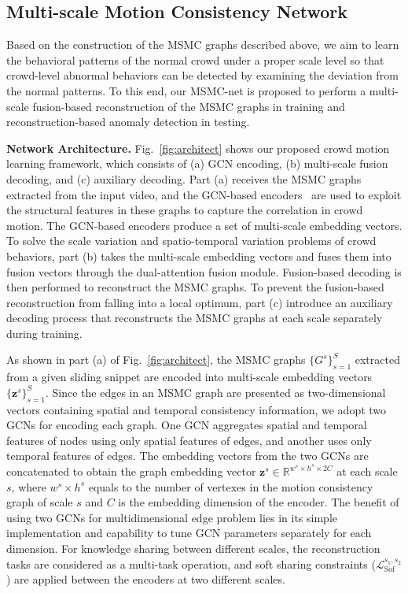\documentclass[journal]{IEEEtran}
\begin{document}
\subsection{Multi-scale Motion Consistency Network}
Based on the construction of the MSMC graphs described above, we aim to learn the behavioral patterns of the normal crowd under a proper scale level so that crowd-level abnormal behaviors can be detected by examining the deviation from the normal patterns. To this end, our MSMC-net is proposed to perform a multi-scale fusion-based reconstruction of the MSMC graphs in training and reconstruction-based anomaly detection in testing.

\vskip 0.03in
\noindent\textbf{Network Architecture.}
Fig.~\ref{fig:architect} shows our proposed crowd motion learning framework, which consists of (a) GCN encoding, (b) multi-scale fusion decoding, and (c) auxiliary decoding. Part (a) receives the MSMC graphs extracted from the input video, and the GCN-based encoders~\cite{welling2016semi} are used to exploit the structural features in these graphs to capture the correlation in crowd motion. The GCN-based encoders produce a set of multi-scale embedding vectors. To solve the scale variation and spatio-temporal variation problems of crowd behaviors, part (b) takes the multi-scale embedding vectors and fuses them into fusion vectors through the dual-attention fusion module. Fusion-based decoding is then performed to reconstruct the MSMC graphs. To prevent the fusion-based reconstruction from falling into a local optimum, part (c) introduce an auxiliary decoding process that reconstructs the MSMC graphs at each scale separately during training.

As shown in part (a) of Fig.~\ref{fig:architect}, the MSMC graphs $ \{G^{s}\}_{s=1}^{S} $ extracted from a given sliding snippet are encoded into multi-scale embedding vectors  $\{\mathbf{z}^s\}_{s=1}^S$. Since the edges in an MSMC graph are presented as two-dimensional vectors containing spatial and temporal consistency information, we adopt two GCNs for encoding each graph. One GCN aggregates spatial and temporal features of nodes using only spatial features of edges, and another uses only temporal features of edges. The embedding vectors from the two GCNs are concatenated to obtain the graph embedding vector $\mathbf{z}^s \in \mathbb{R}^{w^s \times h^s \times 2C}$ at each scale $s$, where $w^s \times h^s $ equals to the number of vertexes in the motion consistency graph of scale $s$ and $C$ is the embedding dimension of the encoder. The benefit of using two GCNs for multidimensional edge problem lies in its simple implementation and capability to tune GCN parameters separately for each dimension. For knowledge sharing between different scales, the reconstruction tasks are considered as a multi-task operation, and soft sharing constraints ($\mathcal{L}^{s_1,s_2}_{\mathrm{Sof}}$) are applied between the encoders at two different scales.
\end{document}
